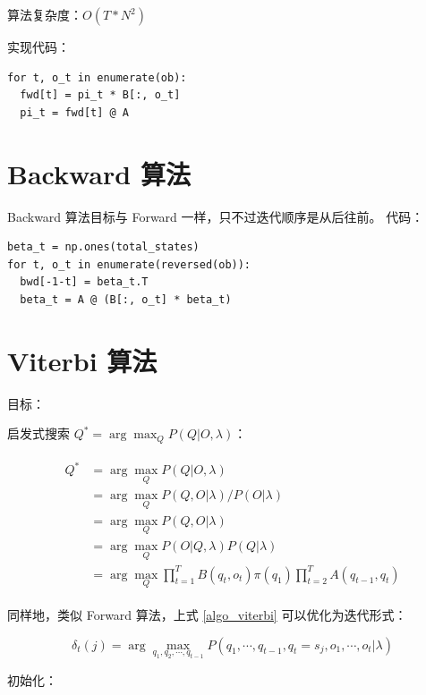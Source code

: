 \documentclass[degree=project,degree-type=project,cjk-font=noto]{thuthesis}
\begin{document}
  算法复杂度：$O(T * N^2)$

  实现代码：

  \begin{verbatim}
for t, o_t in enumerate(ob):
  fwd[t] = pi_t * B[:, o_t]
  pi_t = fwd[t] @ A
  \end{verbatim}


\section{Backward 算法}

Backward 算法目标与 Forward 一样，只不过迭代顺序是从后往前。
代码：

  \begin{verbatim}
beta_t = np.ones(total_states)
for t, o_t in enumerate(reversed(ob)):
  bwd[-1-t] = beta_t.T
  beta_t = A @ (B[:, o_t] * beta_t)
  \end{verbatim}

\section{Viterbi 算法}

目标：

启发式搜索 $Q^* = \arg \max_Q P(Q | O, \lambda)$：

\begin{align}
  \begin{split}
    Q^* &= \arg \max_Q P(Q | O, \lambda) \\
    &= \arg \max_Q P(Q, O | \lambda) / P(O | \lambda) \\
    &= \arg \max_Q P(Q, O | \lambda) \\
    &= \arg \max_Q P(O | Q, \lambda) P(Q | \lambda) \\
    &= \arg \max_Q \prod_{t=1}^T B(q_t, o_t) \pi(q_1) \prod_{t=2}^T A(q_{t-1}, q_t)
  \end{split}
  \label{algo_viterbi}
\end{align}

同样地，类似 Forward 算法，上式 \ref{algo_viterbi} 可以优化为迭代形式：

\begin{equation}
\delta_t (j) = \arg \max_{q_1, q_2, \cdots, q_{t-1}} P(q_1, \cdots, q_{t-1}, q_t=s_j, o_1, \cdots, o_t | \lambda)
\end{equation}

初始化：
\end{document}
